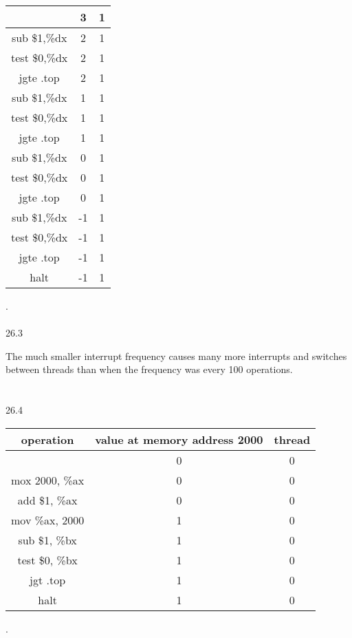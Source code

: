 \documentclass[12pt, a4paper]{article}
\begin{document}
	\begin{center}
	\begin{tabular}{||c c c ||} 
	 \hline
	  & 3 &1\\ 
	 \hline
	 sub \$1,\%dx  & 2 &1\\ 
	 \hline
	 test \$0,\%dx & 2 &1\\
	 \hline
	 jgte .top & 2 &1\\
	 \hline
	  sub \$1,\%dx  & 1 &1\\ 
	 \hline
	 test \$0,\%dx & 1 &1\\
	 \hline
	 jgte .top & 1 &1\\
	 \hline
	  sub \$1,\%dx  & 0 &1\\ 
	 \hline
	 test \$0,\%dx & 0 &1\\
	 \hline
	 jgte .top & 0 &1\\
	 \hline
	  sub \$1,\%dx  & -1 &1\\ 
	 \hline
	 test \$0,\%dx & -1 &1\\
	 \hline
	 jgte .top & -1 &1\\
	 \hline
	 halt & -1 &1\\
	
	 \hline
	\end{tabular}
	\end{center}
	.\\ \\	


26.3

	The much smaller interrupt frequency causes many more interrupts and switches between threads than when the frequency was every 100 operations. 	\\ \\ \\

26.4

	\begin{center}
	\begin{tabular}{||c c c||} 
	 \hline
	  operation &  value at memory address 2000 & thread \\ [0.5ex] 
	 \hline\hline
	 & 0 & 0 \\
	 \hline
	 mox 2000, \%ax  & 0 &0 \\ 
	 \hline
	 add \$1, \%ax & 0 & 0 \\
	 \hline
	 mov \%ax, 2000 & 1 & 0 \\
	 \hline
	 sub \$1, \%bx & 1 & 0 \\
	 \hline
	 test \$0, \%bx & 1 & 0 \\
	\hline
	jgt .top & 1 & 0 \\
	\hline
	halt & 1 & 0 \\ 
	\hline
	\end{tabular}
	\end{center}
	.\\ \\	
\end{document}
